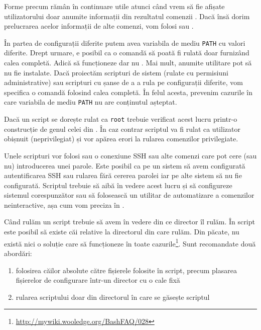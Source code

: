 Forme precum  rămân în continuare utile atunci când vrem să fie afișate utilizatorului doar anumite informații din rezultatul comenzii .
Dacă însă dorim prelucrarea acelor informații de alte comenzi, vom folosi  sau .

În partea de configurații diferite putem avea variabila de mediu \texttt{PATH} cu valori diferite.
Drept urmare, e posibil ca o comandă să poată fi rulată doar furnizând calea completă.
Adică să funcționeze  dar nu .
Mai mult, anumite utilitare pot să nu fie instalate.
Dacă proiectăm scripturi de sistem (rulate cu permisiuni administrative) sau scripturi cu șanse de a a rula pe configurații diferite, vom specifica o comandă folosind calea completă.
În felul acesta, prevenim cazurile în care variabila de mediu \texttt{PATH} nu are conținutul așteptat.

Dacă un script se dorește rulat ca \texttt{root} trebuie verificat acest lucru printr-o construcție de genul celei din .
În caz contrar scriptul va fi rulat ca utilizator obișnuit (neprivilegiat) și vor apărea erori la rularea comenzilor privilegiate.


Unele scripturi vor folosi  sau o conexiune SSH sau alte comenzi care pot cere (sau nu) introducerea unei parole.
Este posibil ca pe un sistem să avem configurată autentificarea SSH sau rularea  fără cererea parolei iar pe alte sistem să nu fie configurată.
Scriptul trebuie să aibă în vedere acest lucru și să configureze sistemul corespunzător sau să folosească un utilitar de automatizare a comenzilor neinteractive, așa cum vom preciza în .

Când rulăm un script trebuie să avem în vedere din ce director îl rulăm.
În script este posibil să existe căi relative la directorul din care rulăm.
Din păcate, nu există nici o soluție care să funcționeze în toate cazurile\footnote{\url{http://mywiki.wooledge.org/BashFAQ/028}}.
Sunt recomandate două abordări:
\begin{enumerate}
  \item folosirea căilor absolute către fișierele folosite în script, precum plasarea fișierelor de configurare într-un director cu o cale fixă
  \item rularea scriptului doar din directorul în care se găsește scriptul
\end{enumerate}

